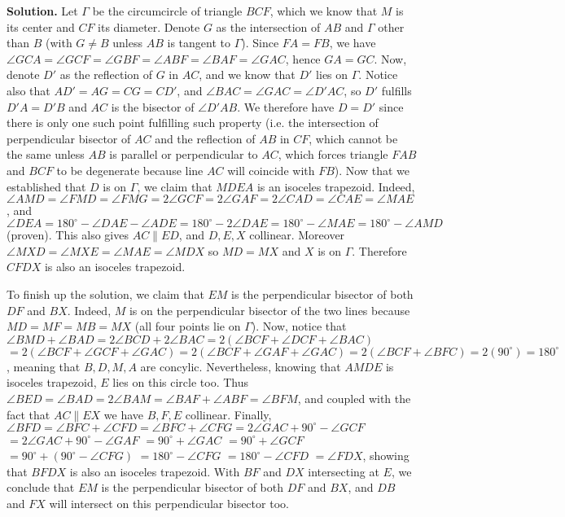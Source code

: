 \documentclass[11pt,a4paper]{article}
\begin{document}
\begin{itemize}
\textbf{Solution.} 
Let $\Gamma$ be the circumcircle of triangle $BCF$, which we know that $M$ is its center and $CF$ its diameter. 
Denote $G$ as the intersection of $AB$ and $\Gamma$ other than $B$ (with $G\neq B$ unless $AB$ is tangent to $\Gamma$). 
Since $FA=FB$, we have 
$\angle GCA=\angle GCF=\angle GBF=\angle ABF=\angle BAF=\angle GAC$, hence $GA=GC$. 
Now, denote $D'$ as the reflection of $G$ in $AC$, and we know that $D'$ lies on $\Gamma$. 
Notice also that $AD'=AG=CG=CD'$, and $\angle BAC=\angle GAC=\angle D'AC$, so $D'$ fulfills $D'A=D'B$ and $AC$ is the bisector of $\angle D'AB$. 
We therefore have $D=D'$ since there is only one such point fulfilling such property (i.e. the intersection of perpendicular bisector of $AC$ and the reflection of $AB$ in $CF$, which cannot be the same unless $AB$ is parallel or perpendicular to $AC$, which forces triangle $FAB$ and $BCF$ to be degenerate because line $AC$ will coincide with $FB$). 
Now that we established that $D$ is on $\Gamma$, we claim that $MDEA$ is an isoceles trapezoid. 
Indeed, $\angle AMD=\angle FMD=\angle FMG=2\angle GCF=2\angle GAF=2\angle CAD=\angle CAE=\angle MAE$, 
and $\angle DEA=180^{\circ}-\angle DAE-\angle ADE=180^{\circ}-2\angle DAE=180^{\circ}-\angle MAE=180^{\circ}-\angle AMD$ 
(proven). This also gives $AC\parallel ED$, and $D, E, X$ collinear. Moreover $\angle MXD=\angle MXE=\angle MAE=\angle MDX$ so $MD=MX$ and $X$ is on $\Gamma$. Therefore $CFDX$ is also an isoceles trapezoid. 

To finish up the solution, we claim that $EM$ is the perpendicular bisector of both $DF$ and $BX$. 
Indeed, $M$ is on the perpendicular bisector of the two lines because $MD=MF=MB=MX$ (all four points lie on $\Gamma$). 
Now, notice that $\angle BMD+\angle BAD=2\angle BCD+2\angle BAC=2(\angle BCF+\angle DCF+\angle BAC)$
$=2(\angle BCF+\angle GCF+\angle GAC)=2(\angle BCF+\angle GAF+\angle GAC)=2(\angle BCF+ \angle BFC)=2(90^{\circ})=180^{\circ}$, 
meaning that $B, D,  M, A$ are concylic. 
Nevertheless, knowing that $AMDE$ is isoceles trapezoid, $E$ lies on this circle too. 
Thus $\angle BED=\angle BAD=2\angle BAM=\angle BAF+\angle ABF=\angle BFM$, and coupled with the fact that $AC\parallel EX$ we have $B, F, E$ collinear. Finally, $\angle BFD=\angle BFC+\angle CFD=\angle BFC+\angle CFG=2\angle GAC+90^{\circ}-\angle GCF$
$=2\angle GAC+90^{\circ}-\angle GAF$
$=90^{\circ}+\angle GAC$
$=90^{\circ}+\angle GCF$
$=90^{\circ}+(90^{\circ}-\angle CFG)$
$=180^{\circ}-\angle CFG$
$=180^{\circ}-\angle CFD$
$=\angle FDX$, 
showing that $BFDX$ is also an isoceles trapezoid. With $BF$ and $DX$ intersecting at $E$, we conclude that $EM$ is the perpendicular bisector of both $DF$ and $BX$, and $DB$ and $FX$ will intersect on this perpendicular bisector too. 


\end{itemize}
\end{document}
